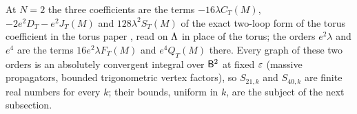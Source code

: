 At $N=2$ the three coefficients are the terms $-16\lambda C_T(M)$, $-2e^2D_T-e^2J_T(M)$ and $128\lambda^2S_T(M)$ of the exact two-loop form of the torus coefficient in the torus paper \cite[App.~G, Lemma~G.1]{SymPhase}, read on $\Lambda$ in place of the torus; the orders $e^2\lambda$ and $e^4$ are the terms $16e^2\lambda F_T(M)$ and $e^4Q_T(M)$ there. Every graph of these two orders is an absolutely convergent integral over $\mathsf B^2$ at fixed $\varepsilon$ (massive propagators, bounded trigonometric vertex factors), so $S_{21,k}$ and $S_{40,k}$ are finite real numbers for every $k$; their bounds, uniform in $k$, are the subject of the next subsection.
